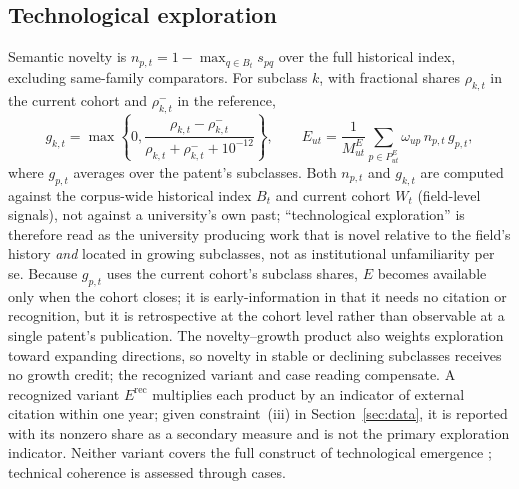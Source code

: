 \subsection{Technological exploration}
Semantic novelty is $n_{p,t}=1-\max_{q\in B_t}s_{pq}$ over the full historical
index, excluding same-family comparators. For subclass $k$, with fractional
shares $\rho_{k,t}$ in the current cohort and $\rho^-_{k,t}$ in the reference,
\begin{equation}
g_{k,t}=\max\!\left\{0,\frac{\rho_{k,t}-\rho^-_{k,t}}
{\rho_{k,t}+\rho^-_{k,t}+10^{-12}}\right\},\qquad
E_{ut}=\frac{1}{M^E_{ut}}\sum_{p\in P^E_{ut}}\omega_{up}\,n_{p,t}\,g_{p,t},
\label{eq:emergence}
\end{equation}
where $g_{p,t}$ averages over the patent's subclasses. Both $n_{p,t}$ and
$g_{k,t}$ are computed against the corpus-wide historical index $B_t$ and
current cohort $W_t$ (field-level signals), not against a university's own
past; ``technological exploration'' is therefore read as the university
producing work that is novel relative to the field's history \emph{and} located
in growing subclasses, not as institutional unfamiliarity per se. Because
$g_{p,t}$ uses the current cohort's subclass shares, $E$ becomes available
only when the cohort closes; it is early-information in that it needs no
citation or recognition, but it is retrospective at the cohort level rather
than observable at a single patent's publication. The novelty--growth product
also weights exploration toward expanding directions, so novelty in stable or
declining subclasses receives no growth credit; the recognized variant and
case reading compensate. A recognized variant $E^{\mathrm{rec}}$ multiplies
each product by an indicator of external citation within one year; given
constraint~(iii) in Section~\ref{sec:data}, it is reported with its nonzero
share as a secondary measure and is not the primary exploration indicator.
Neither variant covers the full construct of technological emergence
\citep{rotolo2015,small2014}; technical coherence is assessed through cases.

